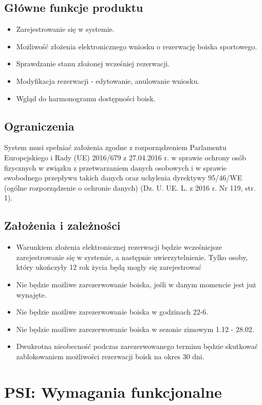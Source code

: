 \documentclass[a4paper,11pt]{article}
\begin{document}
\subsection {Główne funkcje produktu}
\begin{itemize}
	\item Zarejestrowanie się w systemie.
	\item Możliwość złożenia elektronicznego wniosku o rezerwację boiska sportowego.
	\item Sprawdzanie stanu złożonej wcześniej rezerwacji.
	\item Modyfikacja rezerwacji - edytowanie, anulowanie wniosku.
	\item Wgląd do harmonogramu dostępności boisk.
\end{itemize} 

\subsection {Ograniczenia}
System musi spełniać założenia zgodne z rozporządzeniem Parlamentu Europejskiego i Rady (UE) 2016/679 z 27.04.2016 r. w sprawie ochrony osób fizycznych w związku z przetwarzaniem danych osobowych i w sprawie swobodnego przepływu takich danych oraz uchylenia dyrektywy 95/46/WE (ogólne rozporządzenie o ochronie danych) (Dz. U. UE. L. z 2016 r. Nr 119, str. 1).

\subsection {Założenia i zależności}
\begin{itemize}
	\item Warunkiem złożenia elektronicznej rezerwacji będzie 			wcześniejsze zarejestrowanie się w systemie, a następnie uwierzytelnienie. Tylko osoby, który ukończyły 12 rok życia będą mogły się zarejestrować
	\item Nie będzie możliwe zarezerwowanie boiska, jeśli w danym momencie jest już wynajęte.
	\item Nie będzie możliwe zarezerwowanie boiska w godzinach 22-6.
	\item Nie będzie możliwe zarezerwowanie boiska w sezonie zimowym 1.12 - 28.02.
	\item Dwukrotna nieobecność podczas zarezerwowanego terminu będzie skutkować zablokowaniem możliwości rezerwacji boisk na okres 30 dni.
\end{itemize}

\section {PSI: Wymagania funkcjonalne}
\end{document}
